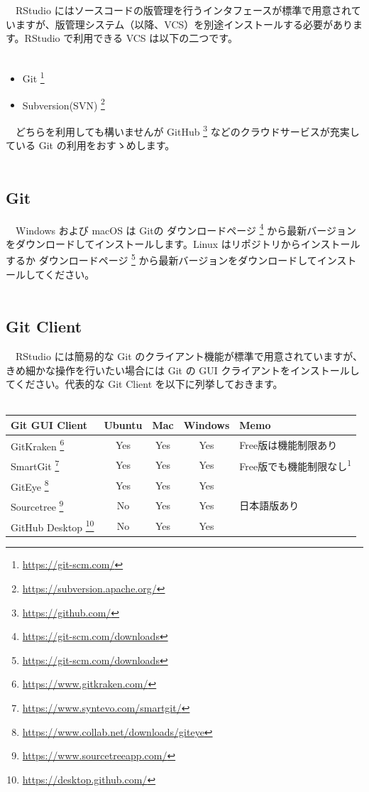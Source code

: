 \documentclass[
  12pt,
]{book}
\DeclareRobustCommand{\href}[2]{#2\footnote{\url{#1}}}
\providecommand{\tightlist}{%
  \setlength{\itemsep}{0pt}\setlength{\parskip}{0pt}}
\begin{document}
　RStudio にはソースコードの版管理を行うインタフェースが標準で用意されていますが、版管理システム（以降、VCS）を別途インストールする必要があります。RStudio で利用できる VCS は以下の二つです。\\
　

\begin{itemize}
\tightlist
\item
  \href{https://git-scm.com/}{Git }
\item
  \href{https://subversion.apache.org/}{Subversion(SVN) }
\end{itemize}

　どちらを利用しても構いませんが \href{https://github.com/}{GitHub } などのクラウドサービスが充実している Git の利用をおすゝめします。\\
　

\hypertarget{git}{%
\subsection{Git}\label{git}}

　Windows および macOS は Gitの \href{https://git-scm.com/downloads}{ダウンロードページ } から最新バージョンをダウンロードしてインストールします。Linux はリポジトリからインストールするか \href{https://git-scm.com/downloads}{ダウンロードページ } から最新バージョンをダウンロードしてインストールしてください。\\
　

\hypertarget{git-client}{%
\subsection{Git Client}\label{git-client}}

　RStudio には簡易的な Git のクライアント機能が標準で用意されていますが、きめ細かな操作を行いたい場合には Git の GUI クライアントをインストールしてください。代表的な Git Client を以下に列挙しておきます。\\
　

\begin{longtable}[]{@{}lcccl@{}}
\toprule
Git GUI Client & Ubuntu & Mac & Windows & Memo \\
\midrule
\endhead
\href{https://www.gitkraken.com/}{GitKraken } & Yes & Yes & Yes & Free版は機能制限あり \\
\href{https://www.syntevo.com/smartgit/}{SmartGit } & Yes & Yes & Yes & Free版でも機能制限なし\textsuperscript{1} \\
\href{https://www.collab.net/downloads/giteye}{GitEye } & Yes & Yes & Yes & \\
\href{https://www.sourcetreeapp.com/}{Sourcetree } & No & Yes & Yes & 日本語版あり \\
\href{https://desktop.github.com/}{GitHub Desktop } & No & Yes & Yes & \\
\bottomrule
\end{longtable}
\end{document}
